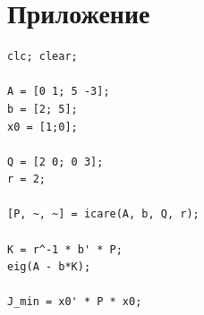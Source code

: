 \documentclass[a4paper,12pt]{article}
\begin{document}
	
	
	
	
	
	
	
	
	
	
	
	
	
	\newpage
	\section{Приложение}
	
	\begin{lstlisting}[caption={Синтез матрицы регулятора}, label=lst:icare]
clc; clear;

A = [0 1; 5 -3];
b = [2; 5];
x0 = [1;0];

Q = [2 0; 0 3];
r = 2;

[P, ~, ~] = icare(A, b, Q, r);

K = r^-1 * b' * P;
eig(A - b*K);

J_min = x0' * P * x0;

\end{lstlisting}
	
\end{document}
